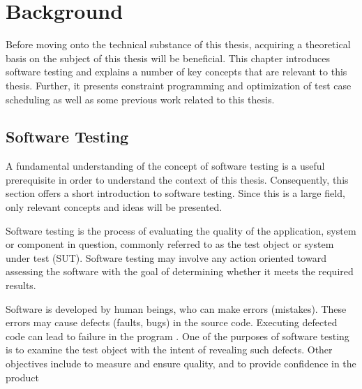 \section{Background}\label{chapter.background}
\thispagestyle{plain}
Before moving onto the technical substance of this thesis, acquiring a theoretical basis on the subject of this thesis will be beneficial. This chapter introduces software testing and explains a number of key concepts that are relevant to this thesis. Further, it presents constraint programming and optimization of test case scheduling as well as some previous work related to this thesis.

\subsection{Software Testing}

A fundamental understanding of the concept of software testing is a useful prerequisite in order to understand the context of this thesis. Consequently, this section offers a short introduction to software testing. Since this is a large field, only relevant concepts and ideas will be presented.  %

Software testing is the process of evaluating the quality of the application, system or component in question, commonly referred to as the test object or system under test (SUT). Software testing may involve any action oriented toward assessing the software with the goal of determining whether it meets the required results. \cite{[http://istqbexamcertification.com/what-is-a-software-testing/]}

Software is developed by human beings, who can make errors (mistakes). These errors may cause defects (faults, bugs) in the source code. Executing defected code can lead to failure in the program  \cite{http://www.istqb.org/downloads/send/2-foundation-level-documents/3-foundation-level-syllabus-2011.html}. One of the purposes of software testing is to examine the test object with the intent of revealing such defects. Other objectives include to measure and ensure quality, and to provide confidence in the product \cite[pp. 8]{SoftwareTestingFoundations}

